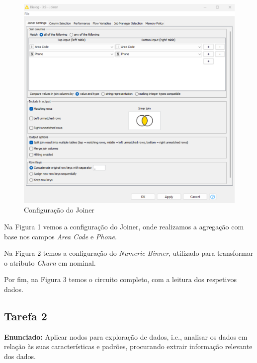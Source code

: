 \documentclass[a4paper, 12pt]{article}
\begin{document}
\vspace{10cm}

\begin{figure}[h]
    \centering
    \includegraphics[scale=0.7]{T1/P1-Joiner.png}
    \caption{Configuração do Joiner}
    \label{fig:enter-label}
\end{figure}

Na Figura 1 vemos a configuração do Joiner, onde realizamos a agregação com base nos campos \textit{Area Code} e \textit{Phone}.   


Na Figura 2 temos a configuração do \textit{Numeric Binner}, utilizado para transformar o atributo \textit{Churn} em nominal. 

Por fim, na Figura 3 temos o circuito completo, com a leitura dos respetivos dados.

\newpage

\subsection{Tarefa 2}
\textbf{Enunciado: }Aplicar nodos para exploração de dados, i.e., analisar os dados em relação às suas características e padrões, procurando extrair informação relevante dos dados.  
\newline
\end{document}
